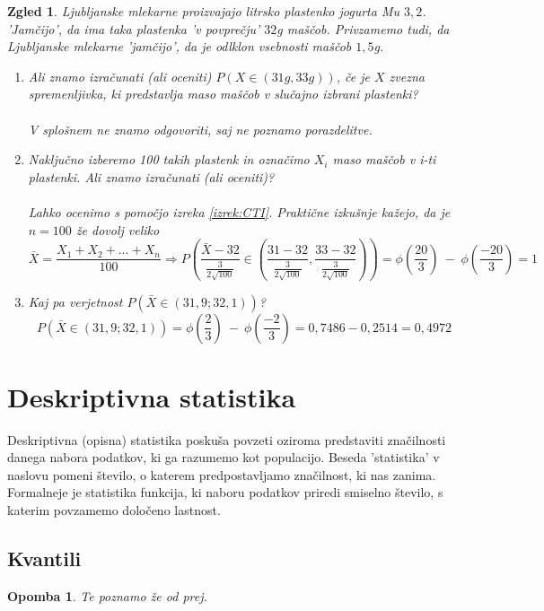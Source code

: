 \documentclass[11pt]{article}
\newtheorem{Zgled}[Izrek]{{\sc Zgled}}
\newtheorem{Opomba}[Izrek]{{\sc Opomba}}
\begin{document}
\begin{Zgled}
	\textnormal{Ljubljanske mlekarne proizvajajo litrsko plastenko jogurta Mu $3,2$. 'Jamčijo', da ima taka plastenka 'v povprečju' $32$g maščob. Privzamemo tudi, da Ljubljanske mlekarne 'jamčijo', da je odlklon vsebnosti maščob $1,5$g.}
	\\
	\begin{enumerate}
		\item
		Ali znamo izračunati (ali oceniti) $P(X\in (31g, 33g))$, če je $X$ zvezna spremenljivka, ki predstavlja maso maščob v slučajno izbrani plastenki?
		\\
		\\
		\textnormal{V splošnem ne znamo odgovoriti, saj ne poznamo porazdelitve.}
		\item
		Naključno izberemo 100 takih plastenk in označimo $X_i$ maso maščob v i-ti plastenki. Ali znamo izračunati (ali oceniti)?
		\\
		\\
		\textnormal{Lahko ocenimo s pomočjo izreka} \ref{izrek:CTI}. \textnormal{Praktične izkušnje kažejo, da je $n= 100$ že dovolj veliko}
		\\
		$$\bar{X} = \frac{X_1 + X_2 + \ldots + X_n}{100} \Rightarrow P\left(\frac{\bar{X} - 32}{\frac{3}{2\sqrt{100}}} \in \left( \frac{31 -32}{\frac{3}{2\sqrt{100}}}, \frac{33 - 32}{\frac{3}{2\sqrt{100}}} \right)   \right) = \phi\left(\frac{20}{3}\right) \ - \;  \phi \left(\frac{-20}{3}\right) = 1 $$
		\item
		Kaj pa verjetnost $P(\bar{X} \in (31{,}9 ; 32{,}1))$? 
		\\
		$$ P(\bar{X} \in (31{,}9 ; 32{,}1)) = \phi\left(\frac{2}{3}\right) \ - \ \phi \left(\frac{-2}{3}\right) = 0,7486 - 0,2514 = 0,4972$$
	\end{enumerate}
\end{Zgled}
\section{Deskriptivna statistika}
	Deskriptivna (opisna) statistika poskuša povzeti oziroma predstaviti značilnosti danega nabora podatkov, ki ga razumemo kot populacijo. Beseda 'statistika' v naslovu pomeni število, o katerem predpostavljamo značilnost, ki nas zanima. Formalneje je statistika funkcija, ki naboru podatkov priredi smiselno število, s katerim povzamemo določeno lastnost.
\subsection{Kvantili}
\begin{Opomba}
Te poznamo že od prej.
\end{Opomba}
\end{document}
